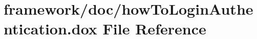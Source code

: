 \hypertarget{how_to_login_authentication_8dox}{}\section{framework/doc/how\+To\+Login\+Authentication.dox File Reference}
\label{how_to_login_authentication_8dox}
